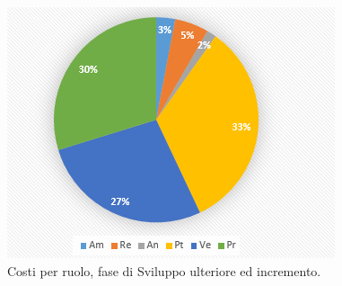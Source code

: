 \documentclass[a4paper]{article}
\begin{document}
			\begin{figure}[H]
				\centering
				\includegraphics[scale=0.7]{pc_costi_incremento}
				\caption{Costi per ruolo, fase di Sviluppo ulteriore ed incremento.}
			\end{figure}
			
\end{document}
